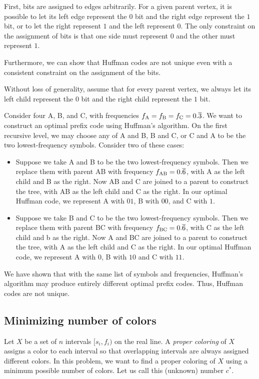 \begin{enumerate}
\begin{solution}
First, bits are assigned to edges arbitrarily. For a given parent vertex, it is possible to let its left edge represent the $0$ bit and the right edge represent the $1$ bit, or to let the right represent $1$ and the left represent $0$. The only constraint on the assignment of bits is that one side must represent $0$ and the other must represent $1$. 

Furthermore, we can show that Huffman codes are not unique even with a consistent constraint on the assignment of the bits. 

Without loss of generality, assume that for every parent vertex, we always let its left child represent the $0$ bit and the right child represent the $1$ bit.

Consider four A, B, and C, with frequencies $f_{\rm A}=f_{\rm B}=f_{\rm C}=0.\overline{3}$. We want to construct an optimal prefix code using Huffman's algorithm. On the first recursive level, we may choose any of A and B, B and C, or C and A to be the two lowest-frequency symbols. Consider two of these cases:
\begin{itemize}
\item Suppose we take A and B to be the two lowest-frequency symbols. Then we replace them with parent AB with frequency $f_{\rm AB}=0.\overline{6}$, with A as the left child and B as the right. Now AB and C are joined to a parent to construct the tree, with AB as the left child and C as the right. In our optimal Huffman code, we represent A with $01$, B with $00$, and C with $1$.

\item Suppose we take B and C to be the two lowest-frequency symbols. Then we replace them with parent BC with frequency $f_{\rm BC}=0.\overline{6}$, with C as the left child and b as the right. Now A and BC are joined to a parent to construct the tree, with A as the left child and C as the right. In our optimal Huffman code, we represent A with $0$, B with $10$ and C with $11$.
\end{itemize}
We have shown that with the same list of symbols and frequencies, Huffman's algorithm may produce entirely different optimal prefix codes. Thus, Huffman codes are not unique.
\end{solution}
\end{enumerate}
\newpage
\subsection{Minimizing number of colors}
Let $X$ be a set of $n$ intervals $[s_i, f_i)$ on the real line. A {\em proper coloring} of $X$ assigns a color to each interval so that overlapping intervals are always assigned different colors.  In this problem, we want to find a proper coloring of $X$ using a minimum possible number of colors. Let us call this (unknown) number $c^*$.

